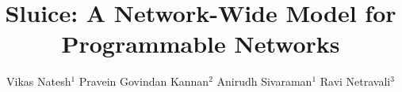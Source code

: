 \documentclass[sigconf]{acmart}
\begin{document}
\title{	Sluice: A Network-Wide Model for Programmable Networks}


\author{Vikas Natesh$^{ 1}$ \space \space    Pravein Govindan Kannan$^{ 2}$  \space \space Anirudh Sivaraman$^{ 1}$  \space \space Ravi Netravali$^{ 3}$}

\renewcommand{\shortauthors}{V. Natesh. et al.}


\maketitle





\end{document}

